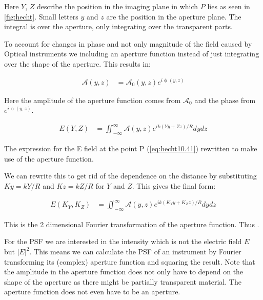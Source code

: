Here $Y$, $Z$ describe the position in the imaging plane in which $P$ lies as seen in \autoref{fig:hecht}. Small letters $y$ and $z$ are the position in the aperture plane. The integral is over the aperture, only integrating over the transparent parts. 

To account for changes in phase and not only magnitude of the field caused by Optical instruments we including an aperture function instead of just integrating over the shape of the aperture. This results in:

\begin{subequations}
  \begin{align}
    \mathscr{A}(y,z) &= \mathscr{A}_0 (y,z)e^{i\upphi(y,z)}
  \end{align}
\end{subequations}

Here the amplitude of the aperture function comes from $\mathscr{A}_0$ and the phase from $e^{i\upphi(y,z)}$.

\begin{subequations}
  \begin{align}
    E(Y,Z) &= \iint_{-\infty}^{\infty} \mathscr{A}(y,z) e^{ik(Yy+Zz)/R} dydz
  \end{align}
\end{subequations}

The expression for the E field at the point P (\autoref{eq:hecht10.41}) rewritten to make use of the aperture function.

We can rewrite this to get rid of the dependence on the distance by substituting $Ky = kY/R$ and $Kz = kZ/R$ for $Y$ and $Z$. This gives the final form: 

\begin{subequations}
  \begin{align}
    E(K_Y,K_Z) &= \iint_{-\infty}^{\infty} \mathscr{A}(y,z) e^{ik(K_Yy+K_Zz)/R} dydz
  \end{align}
\end{subequations}

This is the 2 dimensional Fourier transformation of the aperture function. Thus  \cite{hecht}. 

For the \ac{PSF} we are interested in the intensity which is not the electric field $E$ but ${|E|}^2$. This means we can calculate the \ac{PSF} of an instrument by Fourier transforming its (complex) aperture function and squaring the result. Note that the amplitude in the aperture function does not only have to depend on the shape of the aperture as there might be partially transparent material. The aperture function does not even have to be an aperture.

